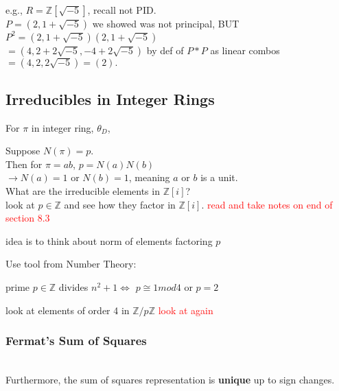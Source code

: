 \documentclass[12pt]{article}
\begin{document}
e.g., $R = \mathbb{Z}[\sqrt{-5}]$, recall not PID.\\
$P = (2, 1 + \sqrt{-5})$ we showed was not principal, BUT \\
$P^2 = (2, 1 + \sqrt{-5})(2, 1 + \sqrt{-5})$\\
$ = ( 4, 2 + 2\sqrt{-5}, -4 + 2\sqrt{-5})$ by def of $P*P$ as linear combos \\
$= (4, 2, 2\sqrt{-5}) = (2).$\\



\subsection*{Irreducibles in Integer Rings}

For $\pi$ in integer ring, $\theta_D$, \\
\centerline{}
\textcolor[gray]{0.5}{Suppose $N(\pi) =p$.\\
Then for $\pi = ab$, $p = N(a)N(b)$\\
$\rightarrow N(a) =1 \text{ or } N(b) =1$, meaning $a$ or $b$ is a unit.}\\

What are the irreducible elements in $\mathbb{Z}[i]$?\\
look at $p \in \mathbb{Z}$ and see how they factor in $\mathbb{Z}[i]$.
\textcolor{red}{read and take notes on end of section 8.3}\\



\centerline{}
\textcolor[gray]{0.5}{idea is to think about norm of elements factoring $p$}


Use tool from Number Theory: \\
\centerline{prime $p \in \mathbb{Z}$ divides $n^2 + 1 \iff$ $p \cong 1 mod 4$ or $p =2$}
\textcolor[gray]{0.5}{look at elements of order 4 in $\mathbb{Z}/p\mathbb{Z}$ \textcolor{red}{look at again}}

\subsubsection*{Fermat's Sum of Squares}
\centerline{}
 \ \\
Furthermore, the sum of squares representation is \textbf{unique} up to sign changes.
\end{document}
